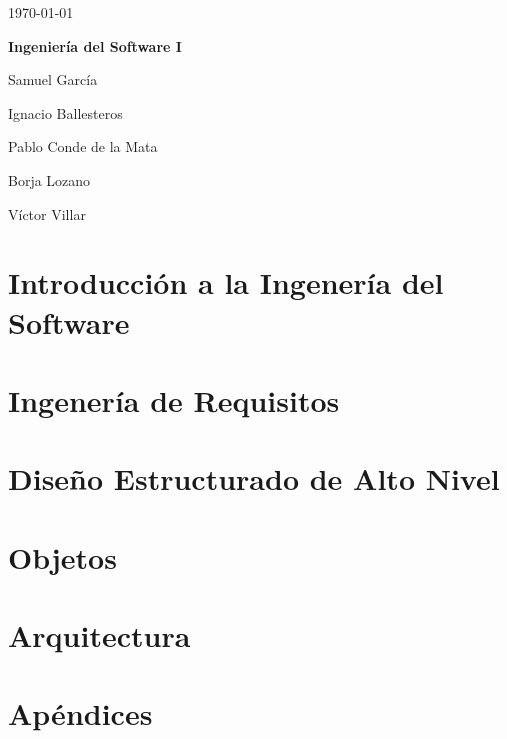 \documentclass[12pt,a4paper]{report}
\begin{document}
\begin{titlepage}
	\hfill \today

	\vspace{.2\textheight}

	\begin{center}
		{\huge\bfseries Ingeniería del Software I\par}
		\vspace{3cm}
		Samuel García \par
		Ignacio Ballesteros \par
                Pablo Conde de la Mata \par
                Borja Lozano \par
                Víctor Villar \par
	\end{center}

\end{titlepage}\tableofcontents


\chapter{Introducción a la Ingenería del Software}
\label{chap:introduccion}


\chapter{Ingenería de Requisitos}
\label{chap:requisitos}


\chapter{Diseño Estructurado de Alto Nivel}
\label{chap:estructurado}


\chapter{Objetos}
\label{chap:objetos}


\chapter{Arquitectura}
\label{chap:arquitectura}



\chapter{Apéndices}
\end{document}
